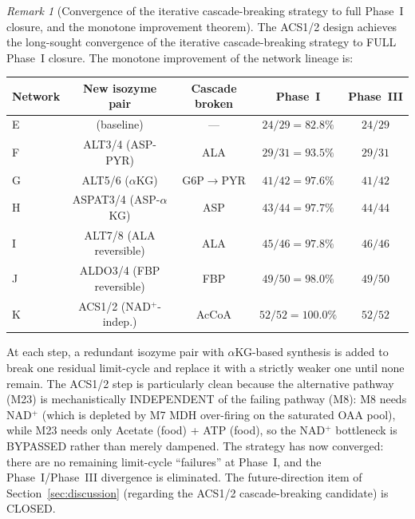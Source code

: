 \documentclass[11pt,a4paper]{article}
\theoremstyle{plain}
\theoremstyle{definition}
\theoremstyle{remark}
\newtheorem{remark}[theorem]{Remark}
\begin{document}
\begin{remark}[Convergence of the iterative cascade-breaking strategy
to full Phase~I closure, and the monotone improvement theorem]
\label{rem:netK-discussion}
The ACS1/2 design achieves the long-sought convergence of the
iterative cascade-breaking strategy to FULL Phase~I closure. The
monotone improvement of the network lineage is:
\begin{center}\footnotesize
\begin{tabular}{lcccc}
\toprule
Network & New isozyme pair & Cascade broken & Phase~I & Phase~III \\
\midrule
E  & (baseline)              & ---    & $24/29 = 82.8\%$  & $24/29$ \\
F  & ALT3/4 (ASP-PYR)        & ALA   & $29/31 = 93.5\%$  & $29/31$ \\
G  & ALT5/6 ($\alpha$KG)     & G6P$\to$PYR & $41/42 = 97.6\%$  & $41/42$ \\
H  & ASPAT3/4 (ASP-$\alpha$KG)& ASP    & $43/44 = 97.7\%$  & $44/44$ \\
I  & ALT7/8 (ALA reversible)  & ALA    & $45/46 = 97.8\%$  & $46/46$ \\
J  & ALDO3/4 (FBP reversible)& FBP    & $49/50 = 98.0\%$  & $49/50$ \\
K  & ACS1/2 (NAD$^+$-indep.)& AcCoA  & $52/52 = 100.0\%$ & $52/52$ \\
\bottomrule
\end{tabular}
\end{center}
At each step, a redundant isozyme pair with $\alpha$KG-based
synthesis is added to break one residual limit-cycle and replace it
with a strictly weaker one until none remain. The ACS1/2 step is
particularly clean because the alternative pathway (M23) is
mechanistically INDEPENDENT of the failing pathway (M8): M8 needs
NAD$^+$ (which is depleted by M7 MDH over-firing on the saturated OAA
pool), while M23 needs only Acetate (food) + ATP (food), so the
NAD$^+$ bottleneck is BYPASSED rather than merely dampened. The
strategy has now converged: there are no remaining limit-cycle
``failures'' at Phase~I, and the Phase~I/Phase~III divergence is
eliminated. The future-direction item of Section~\ref{sec:discussion}
(regarding the ACS1/2 cascade-breaking candidate) is CLOSED.
\end{remark}
\end{document}
